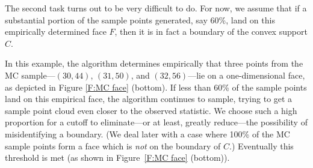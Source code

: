 The second task turns out to be very difficult to do.  
For now, we assume that if a substantial portion of the sample points generated, say 
60\%, land on this empirically determined face $F$, then it is in fact a boundary of 
the convex support $C$.  


In this example, the algorithm determines empirically that three points 
from the MC sample---$(30,44)$, $(31,50)$, and $(32,56)$---lie on a 
one-dimensional face, as depicted in Figure \ref{F:MC face} 
(bottom).  If less than 60\% of the sample points land on this empirical face, the 
algorithm continues to sample, trying to get a sample point cloud even closer to the 
observed statistic.  We choose such a high proportion for a cutoff to eliminate---or 
at least, greatly reduce---the possibility of misidentifying a boundary.
(We deal later with a case where 100\% of the MC sample points form a face which is 
\emph{not} on the boundary of $C$.)  Eventually this threshold is met (as shown in 
Figure~\ref{F:MC face} (bottom)).
